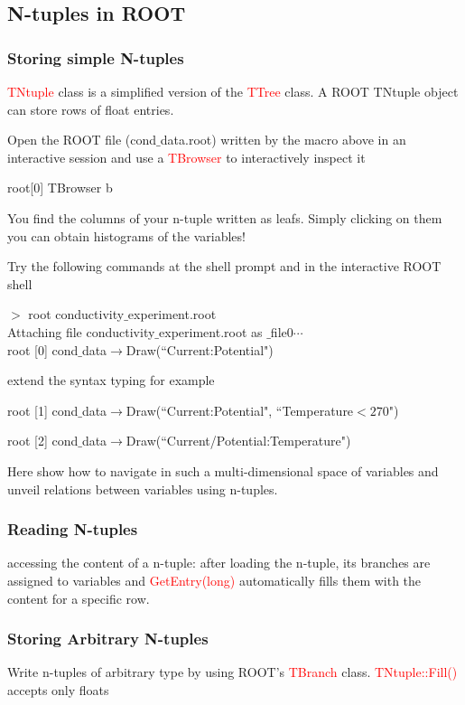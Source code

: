 \documentclass[12pt,a4paper]{article}
\begin{document}
\subsection{N-tuples in ROOT}

\subsubsection{Storing simple N-tuples}
\textcolor{red}{TNtuple} class is a simplified version of the \textcolor{red}{TTree} class. A ROOT TNtuple object can store rows of float entries.

Open the ROOT file (cond$\_$data.root) written by the macro above in an interactive session and use a \textcolor{red}{TBrowser} to interactively inspect it

root[0] TBrowser b

You find the columns of your n-tuple written as leafs. Simply clicking on them you can obtain histograms of the variables!

Try the following commands at the shell prompt and in the interactive ROOT shell

$>$ root conductivity$\_$experiment.root \\
Attaching file conductivity$\_$experiment.root as $\_$file0$\cdots$ \\
root [0] cond$\_$data$\rightarrow$Draw(``Current:Potential")

extend the syntax typing for example

root [1] cond$\_$data$\rightarrow$Draw(``Current:Potential", ``Temperature$<270$")

root [2] cond$\_$data$\rightarrow$Draw(``Current/Potential:Temperature")

Here show how to navigate in such a multi-dimensional space of variables and unveil relations between variables using n-tuples.

\subsubsection{Reading N-tuples}

accessing the content of a n-tuple: after loading the n-tuple, its branches are assigned to variables and \textcolor{red}{GetEntry(long)} automatically fills them with the content for a specific row.

\subsubsection{Storing Arbitrary N-tuples}
Write n-tuples of arbitrary type by using ROOT’s \textcolor{red}{TBranch} class. \textcolor{red}{TNtuple::Fill()} accepts only floats
\end{document}
